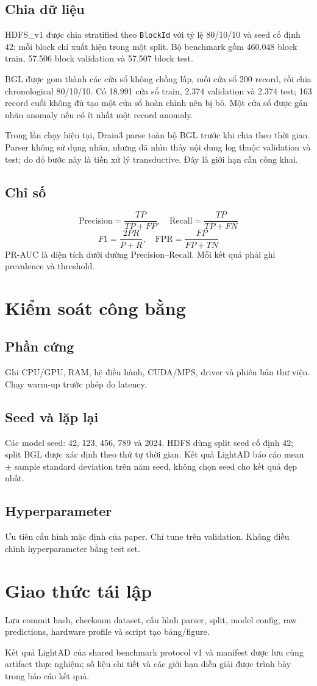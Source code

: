 \subsection{Chia dữ liệu}
HDFS\_v1 được chia stratified theo \texttt{BlockId} với tỷ lệ 80/10/10 và seed
cố định 42; mỗi block chỉ xuất hiện trong một split. Bộ benchmark gồm 460.048
block train, 57.506 block validation và 57.507 block test.

BGL được gom thành các cửa sổ không chồng lấp, mỗi cửa sổ 200 record, rồi chia
chronological 80/10/10. Có 18.991 cửa sổ train, 2.374 validation và 2.374 test;
163 record cuối không đủ tạo một cửa sổ hoàn chỉnh nên bị bỏ. Một cửa sổ được
gán nhãn anomaly nếu có ít nhất một record anomaly.

Trong lần chạy hiện tại, Drain3 parse toàn bộ BGL trước khi chia theo thời gian.
Parser không sử dụng nhãn, nhưng đã nhìn thấy nội dung log thuộc validation và
test; do đó bước này là tiền xử lý transductive. Đây là giới hạn cần công khai.

\subsection{Chỉ số}
\[
\mathrm{Precision}=\frac{TP}{TP+FP},
\quad
\mathrm{Recall}=\frac{TP}{TP+FN}
\]
\[
F1=\frac{2PR}{P+R},
\quad
\mathrm{FPR}=\frac{FP}{FP+TN}
\]
PR-AUC là diện tích dưới đường Precision--Recall. Mỗi kết quả phải ghi
prevalence và threshold.

\section{Kiểm soát công bằng}
\subsection{Phần cứng}
Ghi CPU/GPU, RAM, hệ điều hành, CUDA/MPS, driver và phiên bản thư viện.
Chạy warm-up trước phép đo latency.

\subsection{Seed và lặp lại}
Các model seed: 42, 123, 456, 789 và 2024. HDFS dùng split seed cố định 42;
split BGL được xác định theo thứ tự thời gian. Kết quả LightAD báo cáo mean
$\pm$ sample standard deviation trên năm seed, không chọn seed cho kết quả đẹp
nhất.

\subsection{Hyperparameter}
Ưu tiên cấu hình mặc định của paper. Chỉ tune trên validation. Không điều
chỉnh hyperparameter bằng test set.

\section{Giao thức tái lập}
Lưu commit hash, checksum dataset, cấu hình parser, split, model config, raw
predictions, hardware profile và script tạo bảng/figure.

Kết quả LightAD của shared benchmark protocol v1 và manifest được lưu cùng
artifact thực nghiệm; số liệu chi tiết và các giới hạn diễn giải được trình
bày trong báo cáo kết quả.
